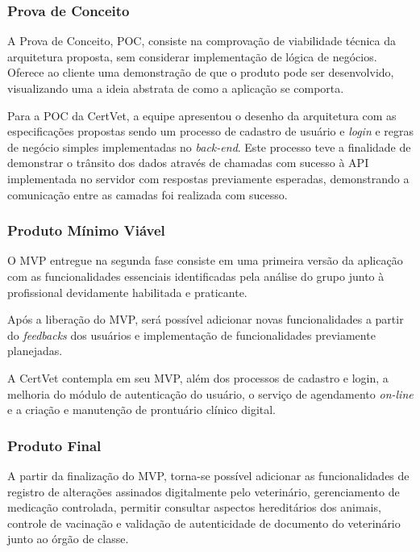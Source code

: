 \documentclass[
    12pt,               %
    openright,          %
    oneside,
    a4paper,            %
    BIBLATEX,           %
    TODO,               %
    english,            %
    brazil              %
    ]{ifsp-spo-inf-ctds}
\begin{document}
        \subsubsection{Prova de Conceito}

            A Prova de Conceito, POC, consiste na comprovação de viabilidade técnica da arquitetura proposta, sem considerar implementação de lógica de negócios. Oferece ao cliente uma demonstração de que o produto pode ser desenvolvido, visualizando uma a ideia abstrata de como a aplicação se comporta. 

            Para a POC da CertVet, a equipe apresentou o desenho da arquitetura com as especificações propostas sendo um processo de cadastro de usuário e \emph{login} e regras de negócio simples implementadas no \emph{back-end}. Este processo teve a finalidade de demonstrar o trânsito dos dados através de chamadas com sucesso à API implementada no servidor com respostas previamente esperadas, demonstrando a comunicação entre as camadas foi realizada com sucesso.

        \subsubsection{Produto Mínimo Viável}

            O MVP entregue na segunda fase consiste em uma primeira versão da aplicação com as funcionalidades essenciais identificadas pela análise do grupo junto à profissional devidamente habilitada e praticante.

            Após a liberação do MVP, será possível adicionar novas funcionalidades a partir do \emph{feedbacks} dos usuários e implementação de funcionalidades previamente planejadas.

            A CertVet contempla em seu MVP, além dos processos de cadastro e login, a melhoria do módulo de autenticação do usuário, o serviço de agendamento \emph{on-line} e a criação e manutenção de prontuário clínico digital.

        \subsubsection{Produto Final}

            A partir da finalização do MVP, torna-se possível adicionar as funcionalidades de registro de alterações assinados digitalmente pelo veterinário, gerenciamento de medicação controlada, permitir consultar aspectos hereditários dos animais, controle de vacinação e validação de autenticidade de documento do veterinário junto ao órgão de classe.
\end{document}
